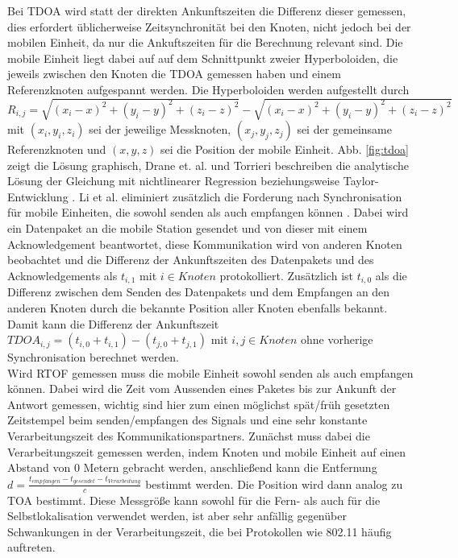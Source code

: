 Bei TDOA wird statt der direkten Ankunftszeiten die Differenz dieser gemessen, dies erfordert üblicherweise Zeitsynchronität bei den Knoten, nicht jedoch bei der mobilen Einheit, da nur die Ankuftszeiten für die Berechnung relevant sind. Die mobile Einheit liegt dabei auf auf dem Schnittpunkt zweier Hyperboloiden, die jeweils zwischen den Knoten die TDOA gemessen haben und einem Referenzknoten aufgespannt werden. 
Die Hyperboloiden werden aufgestellt durch \\
$R_{i,j} = \sqrt{(x_i - x)^2 + (y_i - y)^2 + (z_i - z)^2} - \sqrt{(x_i - x)^2 + (y_i - y)^2 + (z_i - z)^2}$ mit $(x_i,y_i,z_i)$ sei der jeweilige Messknoten, $(x_j,y_j,z_j)$ sei der gemeinsame Referenzknoten und $(x,y,z)$ sei die Position der mobile Einheit. Abb. \ref{fig:tdoa} zeigt die Lösung graphisch, Drane et. al. und Torrieri beschreiben die analytische Lösung der Gleichung mit nichtlinearer Regression \cite{drane1998positioning} beziehungsweise Taylor-Entwicklung \cite{torrieri1984statistical}. 
Li et al. eliminiert zusätzlich die Forderung nach Synchronisation für mobile Einheiten, die sowohl senden als auch empfangen können \cite{li2000comparison}. 
Dabei wird ein Datenpaket an die mobile Station gesendet und von dieser mit einem Acknowledgement beantwortet, diese Kommunikation wird von anderen Knoten beobachtet und die Differenz der Ankunftszeiten des Datenpakets und des Acknowledgements als $t_{i,1}$ mit $i \in Knoten$ protokolliert. Zusätzlich ist $t_{i,0}$ als die Differenz zwischen dem Senden des Datenpakets und dem Empfangen an den anderen Knoten durch die bekannte Position aller Knoten ebenfalls bekannt. Damit kann die Differenz der Ankunftszeit $TDOA_{i,j} = (t_{i,0} + t_{i,1}) - (t_{j,0} + t_{j,1})$ mit $i,j \in Knoten$ ohne vorherige Synchronisation berechnet werden. \\
Wird RTOF gemessen muss die mobile Einheit sowohl senden als auch empfangen können. Dabei wird die Zeit vom Aussenden eines Paketes bis zur Ankunft der Antwort gemessen, wichtig sind hier zum einen möglichst spät/früh gesetzten Zeitstempel beim senden/empfangen des Signals und eine sehr konstante Verarbeitungszeit des Kommunikationspartners. Zunächst muss dabei die Verarbeitungszeit gemessen werden, indem Knoten und mobile Einheit auf einen Abstand von 0 Metern gebracht werden, anschließend kann die Entfernung $d = \frac{t_{empfangen} - t_{gesendet} - t_{Verarbeitung}}{c}$ bestimmt werden. Die Position wird dann analog zu TOA bestimmt. Diese Messgröße kann sowohl für die Fern- als auch für die Selbstlokalisation verwendet werden, ist aber sehr anfällig gegenüber Schwankungen in der Verarbeitungszeit, die bei Protokollen wie 802.11 häufig auftreten. \\
